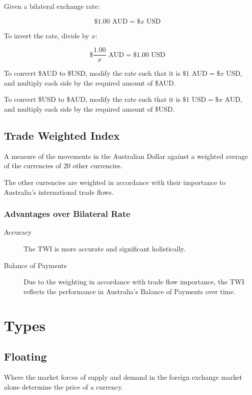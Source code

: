 \documentclass[a4paper,11pt]{article}
\begin{document}
Given a bilateral exchange rate:

$$
\$1.00\text{ AUD} = \$x \text{ USD}
$$

To invert the rate, divide by $x$:

$$
\$\frac{1.00}{x}\text{ AUD} = \$1.00\text{ USD}
$$

To convert \$AUD to \$USD, modify the rate such that it is
$\$1\text{ AUD} = \$x\text{ USD}$, and multiply each side by the required
amount of \$AUD.

To convert \$USD to \$AUD, modify the rate such that it is
$\$1\text{ USD} = \$x\text{ AUD}$, and multiply each side by the required
amount of \$USD.


\subsection{Trade Weighted Index}

A measure of the movements in the Australian Dollar against a weighted average
of the currencies of 20 other currencies.

The other currencies are weighted in accordance with their importance to
Australia's international trade flows.


\subsubsection{Advantages over Bilateral Rate}

\begin{description}
\item [Accuracy] The TWI is more accurate and significant holistically.
\item [Balance of Payments] Due to the weighting in accordance with trade flow
	importance, the TWI reflects the performance in Australia's Balance of
	Payments over time.
\end{description}




\section{Types}

\subsection{Floating}

Where the market forces of supply and demand in the foreign exchange market
alone determine the price of a currency.
\end{document}

